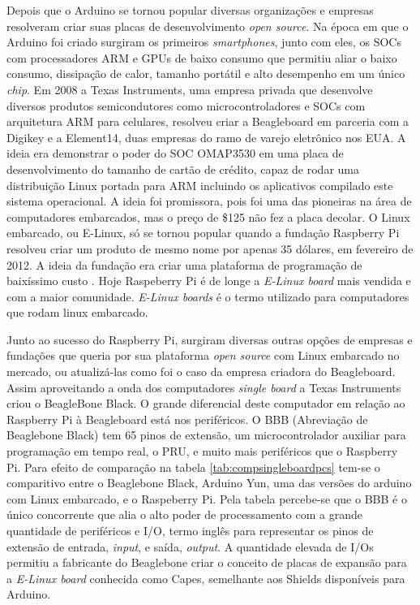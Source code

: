 Depois que o Arduino se tornou popular diversas organizações e empresas resolveram criar suas placas de desenvolvimento \emph{open source}. Na época em que o Arduino foi criado surgiram os primeiros \emph{smartphones}, junto com eles, os SOCs com processadores ARM e GPUs de baixo consumo que permitiu aliar o baixo consumo, dissipação de calor, tamanho portátil e alto desempenho em um único \emph{chip}. Em 2008 a Texas Instruments, uma empresa privada que desenvolve diversos produtos semicondutores como microcontroladores e SOCs com arquitetura ARM para celulares, resolveu criar a Beagleboard em parceria com a Digikey e a Element14, duas empresas do ramo de varejo eletrônico nos EUA. A ideia era demonstrar o poder do SOC  OMAP3530 em uma placa de desenvolvimento do tamanho de cartão de crédito, capaz de rodar uma distribuição Linux portada para ARM incluindo os aplicativos compilado este sistema operacional.  A ideia foi promissora, pois foi uma das pioneiras na área de computadores embarcados, mas o preço de \$125 não fez a placa decolar. O Linux embarcado, ou E-Linux, só se tornou popular quando a fundação Raspberry Pi resolveu criar um produto de mesmo nome por apenas 35 dólares, em fevereiro de 2012. A ideia da fundação era criar uma plataforma de programação de baixíssimo custo \cite{tecmundopi}. Hoje Raspeberry Pi é de longe a \emph{E-Linux board} mais vendida e com a maior comunidade. \emph{E-Linux boards} é o termo utilizado para computadores que rodam linux embarcado.

Junto ao sucesso do Raspberry Pi, surgiram diversas outras opções de empresas e fundações que queria por sua plataforma \emph{open source} com Linux embarcado no mercado, ou atualizá-las como foi o caso da empresa criadora do Beagleboard. Assim aproveitando a onda dos computadores \emph{single board} a Texas Instruments criou o BeagleBone Black. O grande diferencial deste computador em relação ao Raspberry Pi à Beagleboard está nos periféricos. O BBB (Abreviação de Beaglebone Black) tem 65 pinos de extensão, um microcontrolador auxiliar para programação em tempo real, o PRU, e muito mais periféricos que o Raspberry Pi. Para efeito de comparação na tabela \ref{tab:compsingleboardpcs} tem-se o comparitivo entre o Beaglebone Black, Arduino Yun, uma das versões do arduino com Linux embarcado, e o Raspeberry Pi. Pela tabela percebe-se que o BBB é o único concorrente que alia o alto poder de processamento com a grande quantidade de periféricos e I/O, termo inglês para representar os pinos de extensão de entrada, \emph{input}, e saída, \emph{output}. A quantidade elevada de I/Os permitiu a fabricante do Beaglebone criar o conceito de placas de expansão para a \emph{E-Linux board} conhecida como Capes, semelhante aos Shields disponíveis para Arduino. 
	
